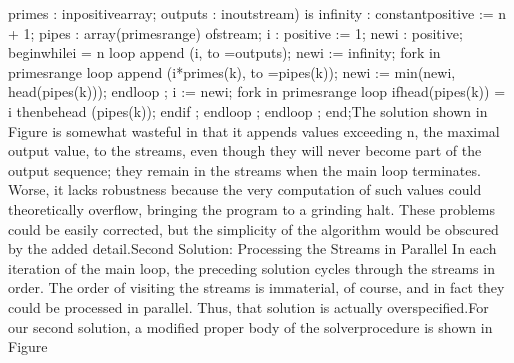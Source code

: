                   primes  : \tyxtstxbf[]in\tyxtstxendbf[]     positive\Symuns[]array;
                  outputs : \tyxtstxbf[]in\tyxtstxendbf[] %
\tyxtstxbf[]out\tyxtstxendbf[] stream) \tyxtstxbf[]is%
\tyxtstxendbf[]
   infinity : \tyxtstxbf[]constant\tyxtstxendbf[] positive := n + 1;
   pipes    : \tyxtstxbf[]array\tyxtstxendbf[] (primes\rsquo[]range) %
\tyxtstxbf[]of\tyxtstxendbf[] stream;
   i        : positive := 1;
   new\Symuns[]i    : positive;
\tyxtstxbf[]begin\tyxtstxendbf[]
   \tyxtstxbf[]while\tyxtstxendbf[] i \Symlt[]= n \tyxtstxbf[]loop%
\tyxtstxendbf[]
      append (i, to =\Symgt[] outputs);
      new\Symuns[]i := infinity;
      \tyxtstxbf[]for\tyxtstxendbf[] k \tyxtstxbf[]in%
\tyxtstxendbf[] primes\rsquo[]range \tyxtstxbf[]loop%
\tyxtstxendbf[]
         append (i*primes(k), to =\Symgt[] pipes(k));
         new\Symuns[]i := min(new\Symuns[]i, head(pipes(k)));
      \tyxtstxbf[]end\tyxtstxendbf[] \tyxtstxbf[]loop%
\tyxtstxendbf[];
      i := new\Symuns[]i;
      \tyxtstxbf[]for\tyxtstxendbf[] k \tyxtstxbf[]in%
\tyxtstxendbf[] primes\rsquo[]range \tyxtstxbf[]loop%
\tyxtstxendbf[]
         \tyxtstxbf[]if\tyxtstxendbf[] head(pipes(k)) = i %
\tyxtstxbf[]then\tyxtstxendbf[]
            behead (pipes(k));
         \tyxtstxbf[]end\tyxtstxendbf[] \tyxtstxbf[]if%
\tyxtstxendbf[];
      \tyxtstxbf[]end\tyxtstxendbf[] \tyxtstxbf[]loop%
\tyxtstxendbf[];
   \tyxtstxbf[]end\tyxtstxendbf[] \tyxtstxbf[]loop%
\tyxtstxendbf[];
\tyxtstxbf[]end\tyxtstxendbf[];\Endcomp[]
\EndParbox[]
\FgEndblock[]
\Endpara[]
\Para[]The solution shown in Figure 
is somewhat wasteful in that it appends values exceeding %
\tyxffmxmono[]n\tyxffmxendmono[], the maximal output value, to the
streams, even though they will never become part of the output sequence;
they remain in the streams when the main loop terminates. Worse, it
lacks robustness because the very computation of such values could
theoretically overflow, bringing the program to a grinding halt. These
problems could be easily corrected, but the simplicity of the algorithm
would be obscured by the added detail.\Endpara[]
\DivEndiv[]
\DivLiv[]\HdMinLiv[]Second Solution: Processing the Streams in Parallel%
\HdMinEndiv[]
\Para[]In each iteration of the main loop, the preceding solution
cycles through the streams in order. The order of visiting the streams
is immaterial, of course, and in fact they could be processed in parallel.
Thus, that solution is actually overspecified.\Endpara[]
\Para[]For our second solution, a modified proper body of the %
\tyxffmxmono[]solver\tyxffmxendmono[] procedure is shown in Figure
